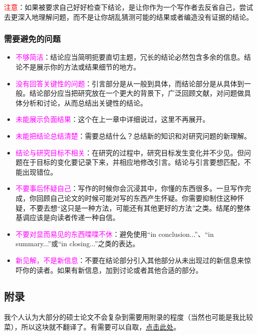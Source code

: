 \documentclass[cn,hazy,blue,14pt,screen]{elegantnote} %
\begin{document}
\textcolor{red}{注意}：如果被要求自己好好检查下结论，是让你作为一个写作者去反省自己，尝试去更深入地理解问题，而不是让你胡乱猜测可能的结果或者编造没有证据的结论。

\subsubsection{需要避免的问题}

\begin{itemize}
  \item \textcolor{magenta}{不够简洁}：结论应当简明扼要直切主题，冗长的结论必然包含多余的信息。结论不是展示你的方法或结果细节的地方。
  \item \textcolor{magenta}{没有回答关键性的问题}：引言部分是从一般到具体，而结论部分是从具体到一般。结论部分应当把研究放在一个更大的背景下，广泛回顾文献，对问题做具体分析和讨论，从而总结出关键性的结论。
  \item \textcolor{magenta}{未能展示负面结果}：这个在上一章中详细说过，这里不再展开。
  \item \textcolor{magenta}{未能把结论总结清楚}：需要总结什么？总结新的知识和对研究问题的新理解。
  \item \textcolor{magenta}{结论与研究目标不相关}：在研究的过程中，研究目标发生变化并不少见。但问题在于目标的变化要记录下来，并相应地修改引言。结论与引言要想匹配，不能出现错位。
  \item \textcolor{magenta}{不要事后怀疑自己}：写作的时候你会沉浸其中，你懂的东西很多。一旦写作完成，你回顾自己论文的时候可能对写的东西产生怀疑。你需要抑制住这种怀疑，不要去想“这只是一种方法，可能还有其他更好的方法”之类。结尾的整体基调应该是向读者传递一种自信。
  \item \textcolor{magenta}{不要对显而易见的东西喋喋不休}：避免使用“in conclusion...”、“in summary...”或“in closing...”之类的表达。
  \item \textcolor{magenta}{新见解，不是新信息}：不要在结论部分引入其他部分从未出现过的新信息来惊吓你的读者。如果有新信息，加到讨论或者其他合适的部分。
\end{itemize}

\subsection{附录}

我个人认为大部分的硕士论文不会复杂到需要用附录的程度（当然也可能是我比较菜），所以这块就不翻译了。有需要可以自取，\href{https://libguides.usc.edu/writingguide/appendices}{点击此处}。
\end{document}
